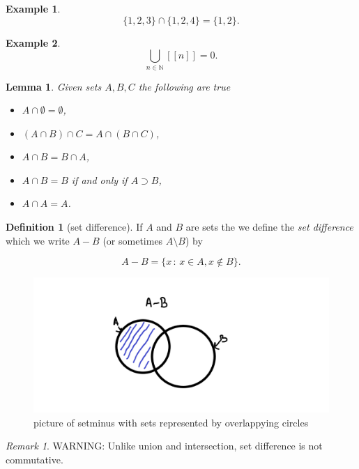 \documentclass[
]{book}
\newtheorem{lemma}{Lemma}[chapter]
\theoremstyle{definition}
\newtheorem{definition}{Definition}[chapter]
\theoremstyle{definition}
\newtheorem{example}{Example}[chapter]
\theoremstyle{definition}
\theoremstyle{definition}
\theoremstyle{remark}
\newtheorem*{remark}{Remark}
\begin{document}
\begin{example}
\[ \{1,2,3\} \cap \{ 1,2,4\} = \{1,2\}.\]
\end{example}

\begin{example}
\[\bigcup_{n \in \mathbb{N}} [[n]] = {0}. \]
\end{example}

\begin{lemma}

Given sets \(A, B, C\) the following are true

\begin{itemize}
\item
  \(A \cap \emptyset = \emptyset\),
\item
  \((A \cap B) \cap C = A \cap (B\cap C)\),
\item
  \(A \cap B = B \cap A\),
\item
  \(A \cap B = B\) if and only if \(A \supset B\),
\item
  \(A \cap A = A\).
\end{itemize}

\end{lemma}

\begin{definition}[set difference]

If \(A\) and \(B\) are sets the we define the \emph{set difference} which we write \(A - B\) (or sometimes \(A \setminus B\)) by

\[ A - B = \{ x \,:\, x \in A, x \notin B\}.  \]

\begin{figure}
\centering
\includegraphics{setminus.png}
\caption{\label{fig:unnamed-chunk-12}picture of setminus with sets represented by overlappying circles}
\end{figure}

\end{definition}

\begin{remark}
WARNING: Unlike union and intersection, set difference is not commutative.
\end{remark}
\end{document}
